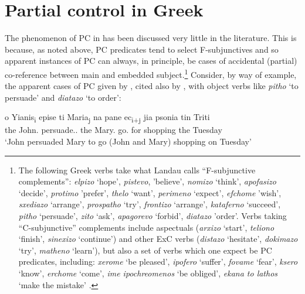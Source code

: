 \documentclass[output=paper]{langsci/langscibook}
\begin{document}
\section{Partial control in Greek}\label{sec:key:24.3}

The phenomenon of \gls{PC} in  has been
discussed very little in the literature. This is because, as noted above,
\gls{PC} predicates tend to select F-subjunctives
and so apparent instances of \gls{PC} can always, in
principle, be cases of accidental (partial) co-reference between main and
embedded subject.\footnote{The following Greek verbs take what Landau calls
    \enquote{F-subjunctive complements}: \emph{elpizo} `hope',
    \emph{pistevo}, 'believe', \emph{nomizo} `think', \emph{apofasizo}
    `decide', \emph{protimo} 'prefer', \emph{thelo} `want', \emph{perimeno}
    `expect', \emph{efchome} 'wish', \emph{sxediazo} `arrange',
    \emph{prospatho} `try', \emph{frontizo} `arrange', \emph{kataferno}
    `succeed', \emph{pitho} `persuade', \emph{zito} `ask', \emph{apagorevo}
    `forbid', \emph{diatazo} 'order'. Verbs taking \enquote{C-subjunctive}
    complements include aspectuals (\emph{arxizo} `start', \emph{teliono}
    `finish', \emph{sinexizo} `continue') and other
    \gls{ExC} verbs (\emph{distazo} `hesitate',
    \emph{dokimazo} `try', \emph{matheno} `learn'), but also a set of verbs
    which one expect be \gls{PC} predicates,
    including: \emph{xerome} `be pleased', \emph{ipofero} `suffer',
    \emph{fovame} `fear', \emph{ksero} `know', \emph{erchome} `come', \emph{ime
ipochreomenos} `be obliged', \emph{ekana to lathos} `make the mistake'
\parencite[Ch.\ 4]{Varlokosta1994}.\label{fn:24.4}} Consider, by way of
example, the apparent cases of \gls{PC} given by
\textcite{Spyropoulos2007b}, cited also by \textcite{Kapetangianni2010}, with
object  verbs like \emph{pitho} `to persuade' and \emph{diatazo} `to
order':

\ea%
    \label{ex:key:24.16}
    \sn
	\gll o Yianis\textsubscript{i}       epise         ti Maria\textsubscript{j}       na     pane ec\textsubscript{i+j} jia psonia tin Triti\\
		the John.\Nom{}   persuade.\Tsg.\Pst{}    the Mary.\Acc{}    \Sbjv{} go.\Tpl{} {} for shopping the Tuesday\\
	\glt ‘John persuaded Mary to go (John and Mary) shopping on Tuesday’
\z
\end{document}
